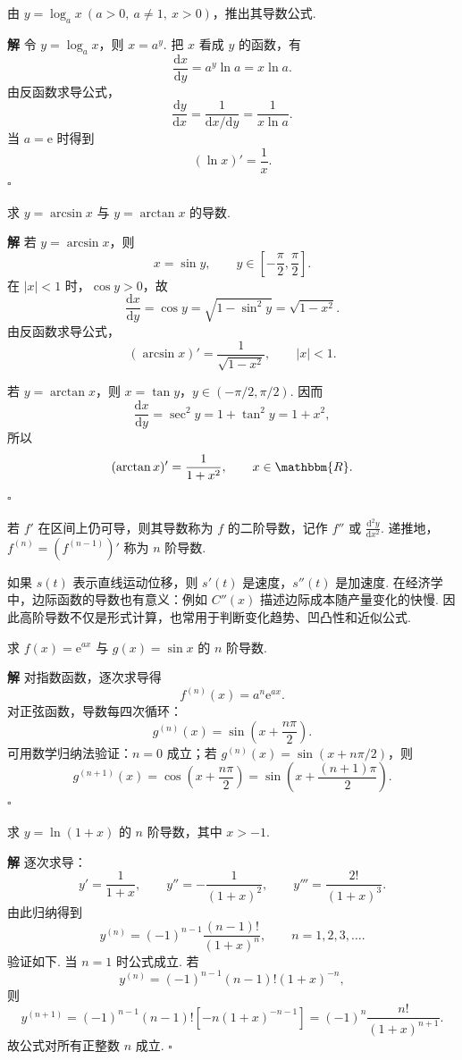 \documentclass[fontset=fandol]{ctexart}
\newenvironment{solution}{\par\noindent\textbf{解}\quad}{\hfill$\square$\par\vspace{0.8em}}
\newcommand{\dd}{\mathrm{d}}
\newcommand{\ee}{\mathrm{e}}
\newcommand{\RR}{\mathbbm{R}}
\begin{document}
\begin{example}[由反函数推出对数函数导数]
由 $y=\log_a x\ (a>0,\ a\neq1,\ x>0)$，推出其导数公式.
\end{example}
\begin{solution}
令 $y=\log_a x$，则 $x=a^y$. 把 $x$ 看成 $y$ 的函数，有
\[
\frac{\dd x}{\dd y}=a^y\ln a=x\ln a.
\]
由反函数求导公式，
\[
\frac{\dd y}{\dd x}
=\frac{1}{\dd x/\dd y}
=\frac{1}{x\ln a}.
\]
当 $a=\ee$ 时得到
\[
(\ln x)'=\frac1x.
\]
\end{solution}

\begin{example}[反三角函数导数]
求 $y=\arcsin x$ 与 $y=\arctan x$ 的导数.
\end{example}
\begin{solution}
若 $y=\arcsin x$，则
\[
x=\sin y,\qquad y\in\left[-\frac{\pi}{2},\frac{\pi}{2}\right].
\]
在 $|x|<1$ 时，$\cos y>0$，故
\[
\frac{\dd x}{\dd y}=\cos y=\sqrt{1-\sin^2y}=\sqrt{1-x^2}.
\]
由反函数求导公式，
\[
(\arcsin x)'=\frac{1}{\sqrt{1-x^2}},\qquad |x|<1.
\]

若 $y=\arctan x$，则 $x=\tan y$，$y\in(-\pi/2,\pi/2)$. 因而
\[
\frac{\dd x}{\dd y}=\sec^2y=1+\tan^2y=1+x^2,
\]
所以
\[
(\arctan x)'=\frac1{1+x^2},\qquad x\in\RR.
\]
\end{solution}

\begin{definition}[高阶导数]
若 $f'$ 在区间上仍可导，则其导数称为 $f$ 的二阶导数，记作 $f''$ 或 $\frac{\dd^2y}{\dd x^2}$. 递推地，$f^{(n)}=(f^{(n-1)})'$ 称为 $n$ 阶导数.
\end{definition}

如果 $s(t)$ 表示直线运动位移，则 $s'(t)$ 是速度，$s''(t)$ 是加速度. 在经济学中，边际函数的导数也有意义：例如 $C''(x)$ 描述边际成本随产量变化的快慢. 因此高阶导数不仅是形式计算，也常用于判断变化趋势、凹凸性和近似公式.

\begin{example}[常用函数高阶导数]
求 $f(x)=\ee^{ax}$ 与 $g(x)=\sin x$ 的 $n$ 阶导数.
\end{example}
\begin{solution}
对指数函数，逐次求导得
\[
f^{(n)}(x)=a^n\ee^{ax}.
\]
对正弦函数，导数每四次循环：
\[
g^{(n)}(x)=\sin\left(x+\frac{n\pi}{2}\right).
\]
可用数学归纳法验证：$n=0$ 成立；若 $g^{(n)}(x)=\sin(x+n\pi/2)$，则
\[
g^{(n+1)}(x)=\cos\left(x+\frac{n\pi}{2}\right)=\sin\left(x+\frac{(n+1)\pi}{2}\right).
\]
\end{solution}

\begin{example}[对数函数的高阶导数]
求 $y=\ln(1+x)$ 的 $n$ 阶导数，其中 $x>-1$.
\end{example}
\begin{solution}
逐次求导：
\[
y'=\frac1{1+x},\qquad
y''=-\frac1{(1+x)^2},\qquad
y'''=\frac{2!}{(1+x)^3}.
\]
由此归纳得到
\[
y^{(n)}=(-1)^{n-1}\frac{(n-1)!}{(1+x)^n},\qquad n=1,2,3,\ldots.
\]
验证如下. 当 $n=1$ 时公式成立. 若
\[
y^{(n)}=(-1)^{n-1}(n-1)!(1+x)^{-n},
\]
则
\[
y^{(n+1)}
=(-1)^{n-1}(n-1)![-n(1+x)^{-n-1}]
=(-1)^n\frac{n!}{(1+x)^{n+1}}.
\]
故公式对所有正整数 $n$ 成立.
\end{solution}
\end{document}
